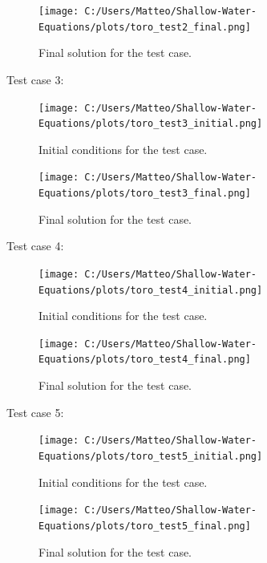 \begin{figure}[H]
    \centering
    \texttt{[image: C:/Users/Matteo/Shallow-Water-Equations/plots/toro\_test2\_final.png]}
    \caption{Final solution for the test case.}\label{fig:toro_test2_final}
\end{figure}


Test case 3:

\begin{figure}[H]
    \centering
    \texttt{[image: C:/Users/Matteo/Shallow-Water-Equations/plots/toro\_test3\_initial.png]}
    \caption{Initial conditions for the test case.}\label{fig:toro_test3_initial}
\end{figure}

\begin{figure}[H]
    \centering
    \texttt{[image: C:/Users/Matteo/Shallow-Water-Equations/plots/toro\_test3\_final.png]}
    \caption{Final solution for the test case.}\label{fig:toro_test3_final}
\end{figure}




Test case 4:

\begin{figure}[H]
    \centering
    \texttt{[image: C:/Users/Matteo/Shallow-Water-Equations/plots/toro\_test4\_initial.png]}
    \caption{Initial conditions for the test case.}\label{fig:toro_test4_initial}
\end{figure}

\begin{figure}[H]
    \centering
    \texttt{[image: C:/Users/Matteo/Shallow-Water-Equations/plots/toro\_test4\_final.png]}
    \caption{Final solution for the test case.}\label{fig:toro_test4_final}
\end{figure}



Test case 5:

\begin{figure}[H]
    \centering
    \texttt{[image: C:/Users/Matteo/Shallow-Water-Equations/plots/toro\_test5\_initial.png]}
    \caption{Initial conditions for the test case.}\label{fig:toro_test5_initial}
\end{figure}

\begin{figure}[H]
    \centering
    \texttt{[image: C:/Users/Matteo/Shallow-Water-Equations/plots/toro\_test5\_final.png]}
    \caption{Final solution for the test case.}\label{fig:toro_test5_final}
\end{figure}



